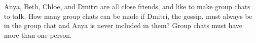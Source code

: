 Anya, Beth, Chloe, and Dmitri are all close friends, and like to make group chats to talk. How many group chats can be made if Dmitri, the gossip, must always be in the group chat and Anya is never included in them? Group chats must have more than one person.
